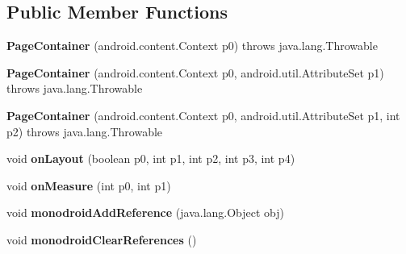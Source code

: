 \subsection*{Public Member Functions}
\begin{DoxyCompactItemize}
\item 
\mbox{\label{classmd5b60ffeb829f638581ab2bb9b1a7f4f3f_1_1PageContainer_a09eff7efc044cb7fe8bad3d17dcef2bf}} 
{\bfseries Page\+Container} (android.\+content.\+Context p0)  throws java.\+lang.\+Throwable 	
\item 
\mbox{\label{classmd5b60ffeb829f638581ab2bb9b1a7f4f3f_1_1PageContainer_ad550ad5dcde007c81aaee8e4be4778c1}} 
{\bfseries Page\+Container} (android.\+content.\+Context p0, android.\+util.\+Attribute\+Set p1)  throws java.\+lang.\+Throwable 	
\item 
\mbox{\label{classmd5b60ffeb829f638581ab2bb9b1a7f4f3f_1_1PageContainer_af875cc61d7fd276d67a7364fc9282d2b}} 
{\bfseries Page\+Container} (android.\+content.\+Context p0, android.\+util.\+Attribute\+Set p1, int p2)  throws java.\+lang.\+Throwable 	
\item 
\mbox{\label{classmd5b60ffeb829f638581ab2bb9b1a7f4f3f_1_1PageContainer_a163d7ce92b315c58198349b7f05f1a91}} 
void {\bfseries on\+Layout} (boolean p0, int p1, int p2, int p3, int p4)
\item 
\mbox{\label{classmd5b60ffeb829f638581ab2bb9b1a7f4f3f_1_1PageContainer_a24278f432b2d8c0d9076c33f97a373e2}} 
void {\bfseries on\+Measure} (int p0, int p1)
\item 
\mbox{\label{classmd5b60ffeb829f638581ab2bb9b1a7f4f3f_1_1PageContainer_a3221cf5a81133b548c2ee9f69f366643}} 
void {\bfseries monodroid\+Add\+Reference} (java.\+lang.\+Object obj)
\item 
\mbox{\label{classmd5b60ffeb829f638581ab2bb9b1a7f4f3f_1_1PageContainer_a8480055a790d8945498bfcf3c95fc165}} 
void {\bfseries monodroid\+Clear\+References} ()
\end{DoxyCompactItemize}
